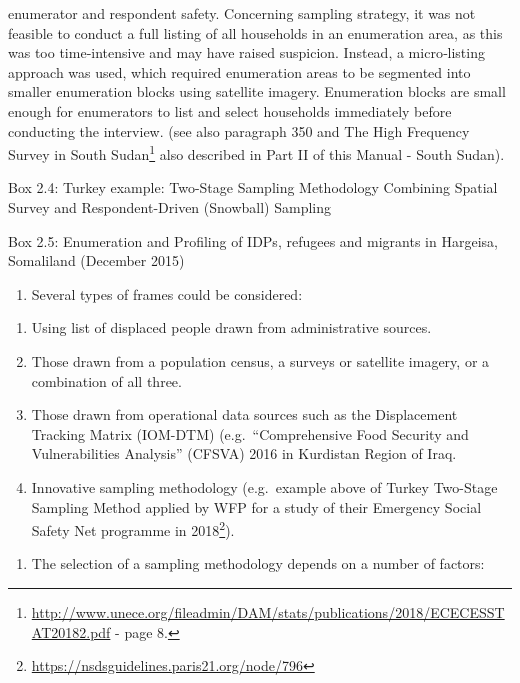 \documentclass[
]{article}
\providecommand{\tightlist}{%
  \setlength{\itemsep}{0pt}\setlength{\parskip}{0pt}}
\begin{document}
\begin{enumerate}
  enumerator and respondent safety. Concerning sampling strategy, it
  was not feasible to conduct a full listing of all households in an
  enumeration area, as this was too time‐intensive and may have raised
  suspicion. Instead, a micro‐listing approach was used, which
  required enumeration areas to be segmented into smaller enumeration
  blocks using satellite imagery. Enumeration blocks are small enough
  for enumerators to list and select households immediately before
  conducting the interview. (see also paragraph 350 and The High
  Frequency Survey in South Sudan\footnote{\url{http://www.unece.org/fileadmin/DAM/stats/publications/2018/ECECESSTAT20182.pdf}
    - page 8.} also described in Part II of
  this Manual - South Sudan).
\end{enumerate}

Box 2.4: Turkey example: Two-Stage Sampling Methodology Combining
Spatial Survey and Respondent-Driven (Snowball) Sampling

Box 2.5: Enumeration and Profiling of IDPs, refugees and migrants in
Hargeisa, Somaliland (December 2015)

\begin{enumerate}
\def\labelenumi{\arabic{enumi}.}
\setcounter{enumi}{136}
\tightlist
\item
  Several types of frames could be considered:
\end{enumerate}

\begin{enumerate}
\def\labelenumi{\roman{enumi}.}
\item
  Using list of displaced people drawn from administrative sources.
\item
  Those drawn from a population census, a surveys or satellite
  imagery, or a combination of all three.
\item
  Those drawn from operational data sources such as the Displacement
  Tracking Matrix (IOM-DTM) (e.g.~``Comprehensive Food Security and
  Vulnerabilities Analysis'' (CFSVA) 2016 in Kurdistan Region of Iraq.
\item
  Innovative sampling methodology (e.g.~example above of Turkey
  Two-Stage Sampling Method applied by WFP for a study of their
  Emergency Social Safety Net programme in 2018\footnote{\url{https://nsdsguidelines.paris21.org/node/796}}).
\end{enumerate}

\begin{enumerate}
\def\labelenumi{\arabic{enumi}.}
\setcounter{enumi}{137}
\tightlist
\item
  The selection of a sampling methodology depends on a number of
  factors:
\end{enumerate}
\end{document}
